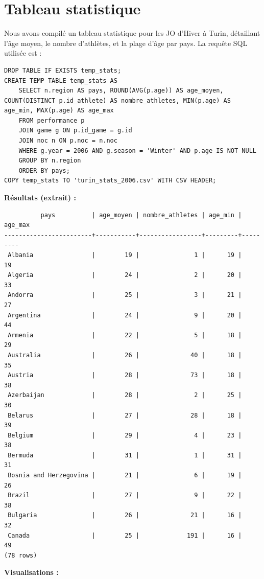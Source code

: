 \documentclass[fontsize=10pt,oneside]{scrreprt}
\begin{document}
\section{Tableau statistique}
Nous avons compilé un tableau statistique pour les JO d'Hiver à Turin, détaillant l'âge moyen, le nombre d'athlètes, et la plage d'âge par pays. La requête SQL utilisée est :
\begin{verbatim}
DROP TABLE IF EXISTS temp_stats;
CREATE TEMP TABLE temp_stats AS
    SELECT n.region AS pays, ROUND(AVG(p.age)) AS age_moyen, COUNT(DISTINCT p.id_athlete) AS nombre_athletes, MIN(p.age) AS age_min, MAX(p.age) AS age_max
    FROM performance p
    JOIN game g ON p.id_game = g.id
    JOIN noc n ON p.noc = n.noc
    WHERE g.year = 2006 AND g.season = 'Winter' AND p.age IS NOT NULL
    GROUP BY n.region
    ORDER BY pays;
COPY temp_stats TO 'turin_stats_2006.csv' WITH CSV HEADER;
\end{verbatim}
\textbf{Résultats (extrait) :}
\begin{verbatim}
          pays          | age_moyen | nombre_athletes | age_min | age_max
------------------------+-----------+-----------------+---------+---------
 Albania                |        19 |               1 |      19 |      19
 Algeria                |        24 |               2 |      20 |      33
 Andorra                |        25 |               3 |      21 |      27
 Argentina              |        24 |               9 |      20 |      44
 Armenia                |        22 |               5 |      18 |      29
 Australia              |        26 |              40 |      18 |      35
 Austria                |        28 |              73 |      18 |      38
 Azerbaijan             |        28 |               2 |      25 |      30
 Belarus                |        27 |              28 |      18 |      39
 Belgium                |        29 |               4 |      23 |      38
 Bermuda                |        31 |               1 |      31 |      31
 Bosnia and Herzegovina |        21 |               6 |      19 |      26
 Brazil                 |        27 |               9 |      22 |      38
 Bulgaria               |        26 |              21 |      16 |      32
 Canada                 |        25 |             191 |      16 |      49
(78 rows)
\end{verbatim}
\textbf{Visualisations :}
\end{document}
